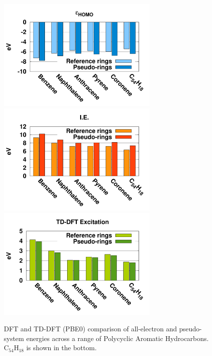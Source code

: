 \documentclass[12pt]{article}
\begin{document}
\begin{figure}
\begin{center}
\includegraphics[width=8cm]{ring_pbe0_homo}
\includegraphics[width=8cm]{ring_pbe0_ie}
\includegraphics[width=8cm]{ring_pbe0_tddft}
\end{center}
\vspace{0.25in}
\hspace*{3in}

\caption{DFT and TD-DFT (PBE0) comparison of all-electron and pseudo-system energies across a range of Polycyclic Aromatic Hydrocarbons. 
C\(_{54}\)H\(_{18}\) is shown in the bottom.}
\label{fig:rings_graphs}
\end{figure}
\end{document}
